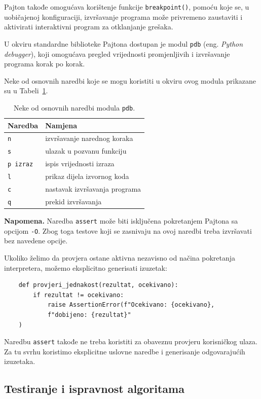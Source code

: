 Pajton takođe omogućava korištenje funkcije 
\texttt{breakpoint()}, pomoću koje se, u uobičajenoj 
konfiguraciji, izvršavanje programa može privremeno 
zaustaviti i aktivirati interaktivni program za 
otklanjanje grešaka.

U okviru standardne biblioteke Pajtona dostupan je 
modul \texttt{pdb} (eng. \emph{Python debugger}), 
koji omogućava pregled vrijednosti promjenljivih 
i izvršavanje programa korak po korak.

Neke od osnovnih naredbi koje se mogu koristiti 
u okviru ovog modula prikazane su u 
Tabeli~\ref{tab:pdb-naredbe}.

\begin{table}[ht]
	\centering
	\begin{tabular}{ll}
		\hline
		Naredba & Namjena \\ \hline
		\texttt{n} & izvršavanje narednog koraka \\
		\texttt{s} & ulazak u pozvanu funkciju \\
		\texttt{p izraz} & ispis vrijednosti izraza \\
		\texttt{l} & prikaz dijela izvornog koda \\
		\texttt{c} & nastavak izvršavanja programa \\
		\texttt{q} & prekid izvršavanja \\ \hline
	\end{tabular}
	\caption{Neke od osnovnih naredbi modula \texttt{pdb}.}
	\label{tab:pdb-naredbe}
\end{table}

\textbf{Napomena.} Naredba \texttt{assert} može biti 
isključena pokretanjem Pajtona sa opcijom \texttt{-O}. 
Zbog toga testove koji se zasnivaju na ovoj naredbi 
treba izvršavati bez navedene opcije.

Ukoliko želimo da provjera ostane aktivna nezavisno 
od načina pokretanja interpretera, možemo eksplicitno 
generisati izuzetak:

\begin{verbatim}
	def provjeri_jednakost(rezultat, ocekivano):
	    if rezultat != ocekivano:
	        raise AssertionError(f"Ocekivano: {ocekivano},  
	        f"dobijeno: {rezultat}"
	)
\end{verbatim}

Naredbu \texttt{assert} takođe ne treba koristiti 
za obaveznu provjeru korisničkog ulaza. Za tu svrhu 
koristimo eksplicitne uslovne naredbe i generisanje 
odgovarajućih izuzetaka.


\subsection{Testiranje i ispravnost algoritama}

